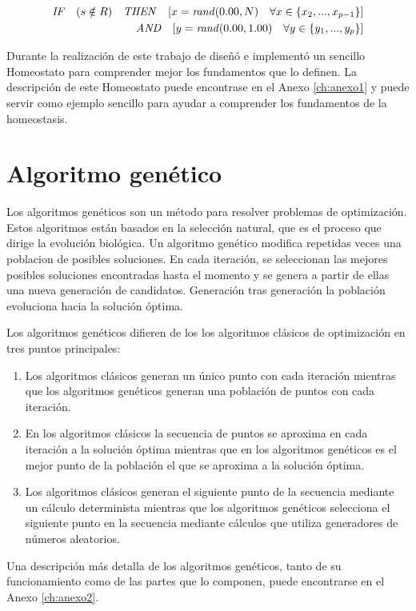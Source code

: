 \begin{equation} \label{eq:transferEQ}
	\begin{aligned}
	 \text{\textit{IF}} \quad (s \notin R) \quad \text{\textit{THEN}} \quad [x= \text{\textit{rand}}(0.00, N) \quad \forall x \in \left \{ x_{2},...,x_{p-1} \right \}]& \\
	 \qquad \qquad \qquad \,\quad  \text{\textit{AND}} \quad [y= \text{\textit{rand}}(0.00, 1.00) \quad \forall y \in \left \{ y_{1},...,y_{p} \right \}]& \\
 \end{aligned}
\end{equation}

Durante la realización de este trabajo de diseñó e implementó un sencillo Homeostato para comprender mejor los fundamentos que lo definen. La descripción de este Homeostato puede encontrase en el Anexo \ref{ch:anexo1} y puede servir como
ejemplo sencillo para ayudar a comprender los fundamentos de la homeostasis.


\section{Algoritmo genético}
Los algoritmos genéticos son un método para resolver problemas de optimización. Estos algoritmos están basados en la selección natural, que es el proceso que dirige la evolución biológica. Un algoritmo genético modifica repetidas veces
una poblacion de posibles soluciones. En cada iteración, se seleccionan las mejores posibles soluciones encontradas hasta el momento y se genera a partir de ellas una nueva generación de candidatos. Generación tras generación la
población evoluciona hacia la solución óptima.

Los algoritmos genéticos difieren de los los algoritmos clásicos de optimización en tres puntos principales:
\begin{enumerate}
	\item{Los algoritmos clásicos generan un único punto con cada iteración mientras que los algoritmos genéticos generan una población de puntos con cada iteración.}
	\item{En los algoritmos clásicos la secuencia de puntos se aproxima en cada iteración a la solución óptima mientras que en los algoritmos genéticos es el mejor punto de la población el que se aproxima a la solución óptima.}
	\item{Los algoritmos clásicos generan el siguiente punto de la secuencia mediante un cálculo determinista mientras que los algoritmos genéticos selecciona el siguiente punto en la secuencia mediante cálculos que utiliza generadores de números aleatorios.}
\end{enumerate}

Una descripción más detalla de los algoritmos genéticos, tanto de su funcionamiento como de las partes que lo componen, puede encontrarse en el Anexo \ref{ch:anexo2}.
